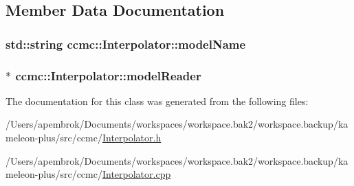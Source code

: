 \subsection{Member Data Documentation}
\hypertarget{classccmc_1_1_interpolator_a7b86407984c4ce59643b926064bdb364}{
\subsubsection[{model\-Name}]{\setlength{\rightskip}{0pt plus 5cm}std\-::string ccmc\-::\-Interpolator\-::model\-Name\hspace{0.3cm}{\ttfamily [protected]}}}\label{classccmc_1_1_interpolator_a7b86407984c4ce59643b926064bdb364}
\hypertarget{classccmc_1_1_interpolator_afee5bb61e5d5a0a7b9152c6f74378c4a}{
\subsubsection[{model\-Reader}]{$\ast$ ccmc\-::\-Interpolator\-::model\-Reader\hspace{0.3cm}{\ttfamily [protected]}}}\label{classccmc_1_1_interpolator_afee5bb61e5d5a0a7b9152c6f74378c4a}


The documentation for this class was generated from the following files\-:\begin{DoxyCompactItemize}
\item 
/\-Users/apembrok/\-Documents/workspaces/workspace.\-bak2/workspace.\-backup/kameleon-\/plus/src/ccmc/\hyperlink{_interpolator_8h}{Interpolator.\-h}\item 
/\-Users/apembrok/\-Documents/workspaces/workspace.\-bak2/workspace.\-backup/kameleon-\/plus/src/ccmc/\hyperlink{_interpolator_8cpp}{Interpolator.\-cpp}\end{DoxyCompactItemize}
